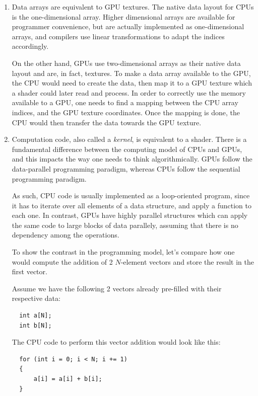 \documentclass[12pt, a4paper]{report}
\begin{document}
\begin{enumerate}
\item Data arrays are equivalent to GPU textures.
The native data layout for CPUs is the one-dimensional array.
Higher dimensional arrays are available for programmer convenience, but are
actually implemented as one-dimensional arrays, and compilers use linear
transformations to adapt the indices accordingly.

On the other hand, GPUs use two-dimensional arrays as their native data layout
and are, in fact, textures.
To make a data array available to the GPU, the CPU would need to create the
data, then map it to a GPU texture which a shader could later read and process.
In order to correctly use the memory available to a GPU, one needs to find a
mapping between the CPU array indices, and the GPU texture coordinates.
Once the mapping is done, the CPU would then transfer the data towards the GPU
texture.

\item Computation code, also called a \emph{kernel}, is equivalent to a shader.
There is a fundamental difference between the computing model of CPUs and GPUs,
and this impacts the way one needs to think algorithmically.
GPUs follow the data-parallel programming paradigm, whereas CPUs follow the
sequential programming paradigm.

As such, CPU code is usually implemented as a loop-oriented program, since it
has to iterate over all elements of a data structure, and apply a function to
each one.
In contrast, GPUs have highly parallel structures which can apply the same code
to large blocks of data parallely, assuming that there is no dependency among
the operations.

To show the contrast in the programming model, let's compare how one would
compute the addition of 2 $N$-element vectors and store the result in the first
vector.

Assume we have the following 2 vectors already pre-filled with their respective
data:

\begin{lstlisting}
  int a[N];
  int b[N];
\end{lstlisting}

The CPU code to perform this vector addition would look like this:

\begin{lstlisting}
  for (int i = 0; i < N; i += 1)
  {
      a[i] = a[i] + b[i];
  }
\end{lstlisting}


\end{enumerate}
\end{document}
